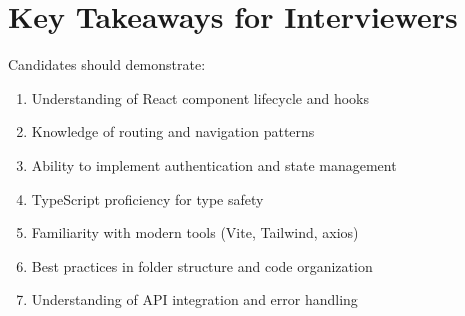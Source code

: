 \documentclass[12pt]{article}
\begin{document}
\section*{Key Takeaways for Interviewers}

Candidates should demonstrate:

\begin{enumerate}
    \item Understanding of React component lifecycle and hooks
    \item Knowledge of routing and navigation patterns
    \item Ability to implement authentication and state management
    \item TypeScript proficiency for type safety
    \item Familiarity with modern tools (Vite, Tailwind, axios)
    \item Best practices in folder structure and code organization
    \item Understanding of API integration and error handling
\end{enumerate}
\end{document}
